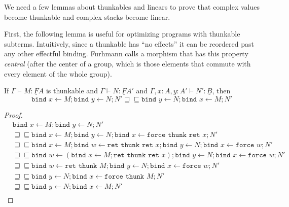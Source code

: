 \documentclass[acmsmall,screen,12pt]{acmart}
\renewcommand{\u}{\underline}
\newcommand{\ltdyn}{\sqsubseteq}
\newcommand{\gtdyn}{\sqsupseteq}
\newcommand{\equidyn}{\mathrel{\gtdyn\ltdyn}}
\newcommand{\bindXtoYinZ}[2]{\kw{bind}#2 \leftarrow #1;}
\newcommand{\kw}[1]{\texttt{#1}\,\,}
\newcommand{\ret}{\kw{ret}}
\newcommand{\thunk}{\kw{thunk}}
\newcommand{\force}{\kw{force}}
\begin{document}
{\begin{longonly}
We need a few lemmas about thunkables and linears to prove that complex
values become thunkable and complex stacks become linear.

First, the following lemma is useful for optimizing programs with
thunkable subterms.  Intuitively, since a thunkable has ``no effects''
it can be reordered past any other effectful binding.  Furhmann
\citep{fuhrmann1999direct} calls a morphism that has this property
\emph{central} (after the center of a group, which is those elements
that commute with every element of the whole group).
\begin{lemma}
  If $\Gamma \vdash M : \u F A$ is thunkable and $\Gamma \vdash N : \u
  F A'$ and $\Gamma , x:A, y:A' \vdash N' : \u B$, then
  \[
  \bindXtoYinZ M x \bindXtoYinZ N y N'
  \equidyn
 \bindXtoYinZ N y \bindXtoYinZ M x N'
  \]
\end{lemma}
\begin{proof}
  \begin{align*}
    &\bindXtoYinZ M x \bindXtoYinZ N y N'\\
    &\equidyn
    \bindXtoYinZ M x \bindXtoYinZ N y \bindXtoYinZ {\force \thunk \ret x} x N' \tag{$U\beta,\u F\beta$}\\
    &\equidyn\bindXtoYinZ M x \bindXtoYinZ {\ret\thunk\ret x} w \bindXtoYinZ N y \bindXtoYinZ {\force w} x N' \tag{$\u F\beta$}\\
    &\equidyn\bindXtoYinZ {(\bindXtoYinZ M x {\ret\thunk\ret x})} w \bindXtoYinZ N y \bindXtoYinZ {\force w} x N' \tag{$\u F\eta$}\\
    &\equidyn\bindXtoYinZ {\ret \thunk M} w \bindXtoYinZ N y \bindXtoYinZ {\force w} x N' \tag{$M$ thunkable}\\    
    &\equidyn\bindXtoYinZ N y \bindXtoYinZ {\force \thunk M} x N' \tag{$\u F\beta$}\\
    &\equidyn\bindXtoYinZ N y \bindXtoYinZ M x N' \tag{$U\beta$}\\    
  \end{align*}
\end{proof}


\end{longonly}}
\end{document}
